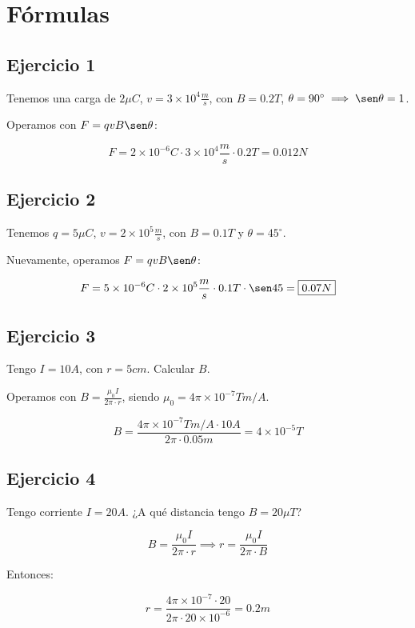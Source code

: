 \section{Fórmulas}

\subsection{Ejercicio 1}


Tenemos una carga de \(2\mu C\), \(v = 3\times10^{4}\frac{m}{s}\),
con \(B = 0.2T\), \(\theta=90^{\circ}\implies\sen\theta=1\).

Operamos con \(F = qvB\sen\theta\):

\begin{equation*}
    F = 2\times10^{-6} C \cdot 3\times10^{4}\frac{m}{s} \cdot 0.2T = \boxed{0.012N}
\end{equation*}

\subsection{Ejercicio 2}

Tenemos \(q = 5\mu C\), \(v = 2\times10^{5}\frac{m}{s}\),
con \(B=0.1T\) y \(\theta = 45^{\circ}\).

Nuevamente, operamos \(F = qvB\sen\theta\):

\begin{equation*}
    F = 5\times10^{-6}C \cdot 2\times10^{5}\frac{m}{s} \cdot 0.1T \cdot \sen45 = \boxed{0.07 N}
\end{equation*}

\subsection{Ejercicio 3}

Tengo \(I = 10A\), con \(r=5cm\).
Calcular \(B\).

Operamos con \(B = \frac{\mu_0I}{2\pi\cdot r}\),
siendo \(\mu_0 = 4\pi\times10^{-7}Tm/A\).

\begin{equation*}
    B = \frac{4\pi\times10^{-7}Tm/A\cdot10A}{2\pi\cdot 0.05m}=\boxed{4\times10^{-5}T}
\end{equation*}

\subsection{Ejercicio 4}

Tengo corriente \(I = 20A\).
¿A qué distancia tengo \(B = 20 \mu T\)?

\begin{equation*}
    B = \frac{\mu_0I}{2\pi\cdot r} \implies r = \frac{\mu_0I}{2\pi\cdot B}
\end{equation*}

Entonces:

\begin{equation*}
    r = \frac{4\pi\times10^{-7}\cdot20}{2\pi\cdot 20\times10^{-6}} = \boxed{0.2m}
\end{equation*}